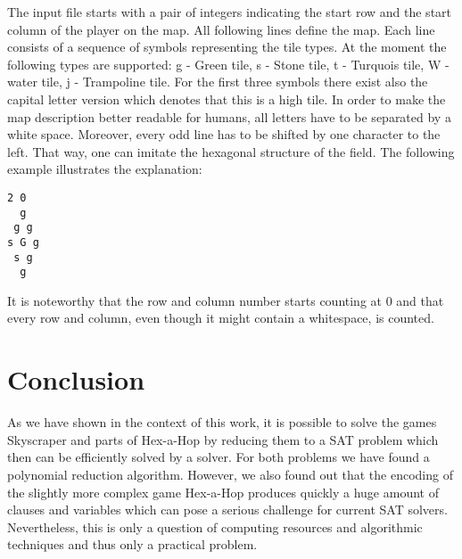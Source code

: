 \documentclass[a4paper, 12pt, titlepage]{article}
\begin{document}
The input file starts with a pair of integers indicating the start row and the start column of the player on the map. 
All following lines define the map. 
Each line consists of a sequence of symbols representing the tile types. 
At the moment the following types are supported: \pmb g - Green tile, \pmb s - Stone tile, \pmb t - Turquois tile, \pmb W - water tile, \pmb j - Trampoline tile. 
For the first three symbols there exist also the capital letter version which denotes that this is a high tile. 
In order to make the map description better readable for humans, all letters have to be separated by a white space. 
Moreover, every odd line has to be shifted by one character to the left. 
That way, one can imitate the hexagonal structure of the field. 
The following example illustrates the explanation:
\begin{verbatim}
2 0
  g
 g g
s G g
 s g
  g	
\end{verbatim}
It is noteworthy that the row and column number starts counting at 0 and that every row and column, even though it might contain a whitespace, is counted.


\section{Conclusion}

As we have shown in the context of this work, it is possible to solve the games Skyscraper and parts of Hex-a-Hop by reducing them to a SAT problem which then can be efficiently solved by a solver. 
For both problems we have found a polynomial reduction algorithm.
However, we also found out that the encoding of the slightly more complex game Hex-a-Hop produces quickly a huge amount of clauses and variables which can pose a serious challenge for current SAT solvers.
Nevertheless, this is only a question of computing resources and algorithmic techniques and thus only a practical problem.
\end{document}

